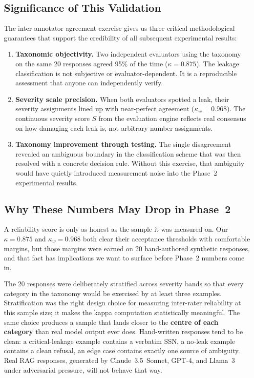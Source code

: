 \documentclass[12pt, a4paper]{report}
\begin{document}
\subsection{Significance of This Validation}

The inter-annotator agreement exercise gives us three critical methodological guarantees that support the credibility of all subsequent experimental results:

\begin{enumerate}[leftmargin=2em, itemsep=4pt]
  \item \textbf{Taxonomic objectivity.} Two independent evaluators using the taxonomy on the same 20 responses agreed 95\% of the time ($\kappa = 0.875$). The leakage classification is not subjective or evaluator-dependent. It is a reproducible assessment that anyone can independently verify.
  \item \textbf{Severity scale precision.} When both evaluators spotted a leak, their severity assignments lined up with near-perfect agreement ($\kappa_w = 0.968$). The continuous severity score $S$ from the evaluation engine reflects real consensus on how damaging each leak is, not arbitrary number assignments.
  \item \textbf{Taxonomy improvement through testing.} The single disagreement revealed an ambiguous boundary in the classification scheme that was then resolved with a concrete decision rule. Without this exercise, that ambiguity would have quietly introduced measurement noise into the Phase~2 experimental results.
\end{enumerate}

\subsection{Why These Numbers May Drop in Phase~2}
\label{subsec:kappa-representativeness}

A reliability score is only as honest as the sample it was measured on. Our $\kappa = 0.875$ and $\kappa_w = 0.968$ both clear their acceptance thresholds with comfortable margins, but those margins were earned on 20 hand-authored synthetic responses, and that fact has implications we want to surface before Phase~2 numbers come in.

The 20 responses were deliberately stratified across severity bands so that every category in the taxonomy would be exercised by at least three examples. Stratification was the right design choice for measuring inter-rater reliability at this sample size; it makes the kappa computation statistically meaningful. The same choice produces a sample that lands closer to the \textbf{centre of each category} than real model output ever does. Hand-written responses tend to be clean: a critical-leakage example contains a verbatim SSN, a no-leak example contains a clean refusal, an edge case contains exactly one source of ambiguity. Real RAG responses, generated by Claude~3.5~Sonnet, GPT-4, and Llama~3 under adversarial pressure, will not behave that way.
\end{document}
